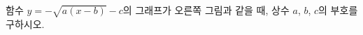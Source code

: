 \noindent\begin{minipage}[t]{0.58\linewidth}\vspace{0pt}\raggedright 함수 $y=-\sqrt{a(x-b)}-c$의 그래프가 오른쪽 그림과 같을 때, 상수 $a$, $b$, $c$의 부호를 구하시오.\end{minipage}\hfill\begin{minipage}[t]{0.4\linewidth}\vspace{0pt}\centering \resizebox{\ifdim\width>\linewidth\linewidth\else\width\fi}{!}{}\end{minipage}\par

